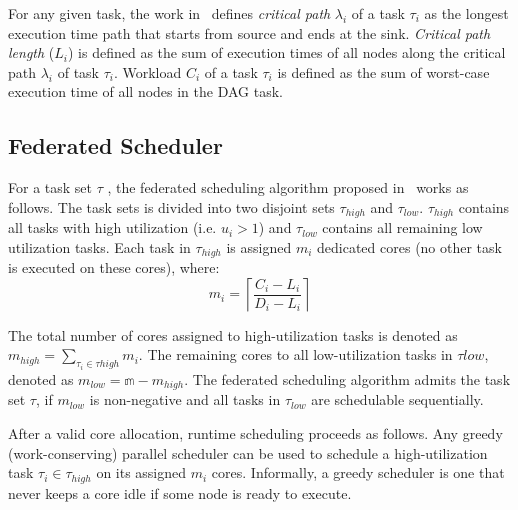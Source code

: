
For any given task, the work in~\cite{li2014analysis} defines \textit{critical path} $\lambda_i$ of a 
task $\tau_i$ as the longest execution time path that starts from
source and ends at the sink. \textit{Critical path length} ($L_i$) is
defined as the sum of execution times of all nodes along the critical
path $\lambda_i$ of task $\tau_{i}$.  Workload $C_{i}$ of
a task $\tau_{i}$ is defined as the sum of worst-case execution time of
all nodes in the DAG task. 

\subsection{Federated Scheduler}
For a task set $\tau$ , the federated scheduling algorithm proposed in~\cite{li2014analysis} works as
follows. The task sets is divided into two disjoint sets
$\tau_{high}$  and $\tau_{low}$. $\tau_{high}$ contains all tasks with
high utilization (i.e. $u_i > 1$) and $\tau_{low}$ contains all
remaining low utilization tasks. Each task in $\tau_{high}$ is
assigned $m_{i}$ dedicated cores (no other task is executed on these
cores), where: \begin{equation}\label{eq:m} m_{i} = \left\lceil \frac{C_{i} - L_{i}}{D_{i} - L_{i}}
\right\rceil \end{equation}

\noindent The total
number of cores assigned to high-utilization tasks is denoted as $m_{high} = \sum_{\tau_{i} \in \tau{high}} m_{i}$. 
The remaining cores to all low-utilization tasks in $\tau{low}$, denoted
as ${m_{low} =  \mathbb{m} - m_{high}}$. The federated scheduling algorithm admits
the task set ${\tau}$, if $m_{low}$ is non-negative and all tasks in
$\tau_{low}$ are schedulable sequentially.  

After a valid core allocation, runtime scheduling proceeds as
follows. Any greedy (work-conserving) parallel scheduler can be used
to schedule a high-utilization task $\tau_{i} \in \tau_{high}$ on its
assigned $m_{i}$ cores. Informally, a greedy scheduler is one that never
keeps a core idle if some node is ready to execute. 

